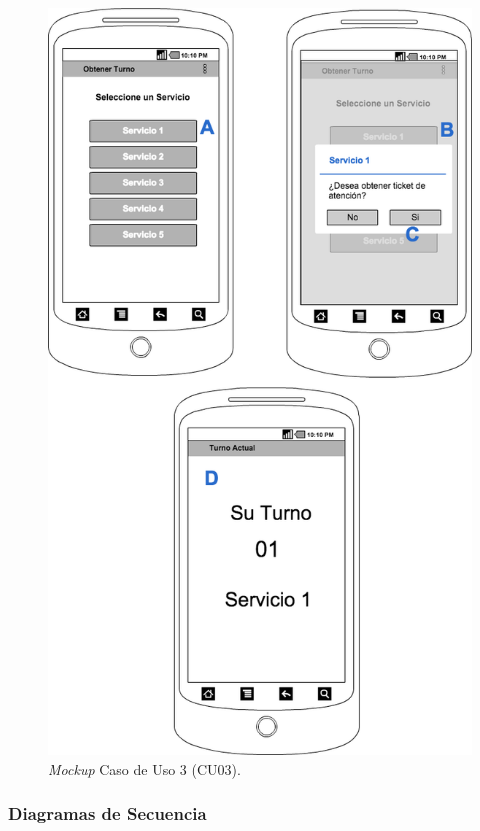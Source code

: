 \begin{figure}[H]
\centering
\includegraphics[scale=0.40]{images/capitulo4/mockupCU03.png}
\caption{\textit{Mockup} Caso de Uso 3 (CU03).}
\label{mockupCU03}
\end{figure}


\subsubsection{Diagramas de Secuencia}

